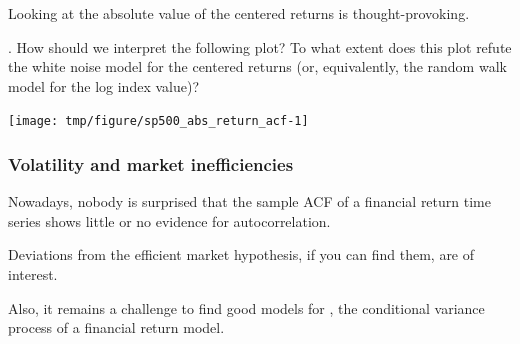 \begin{frame}[fragile]

\vspace{-2mm}

\bi

\item Looking at the absolute value of the centered returns is thought-provoking.

\ei


\myquestion. How should we interpret the following plot? To what extent does this plot refute the white noise model for the centered returns (or, equivalently, the random walk model for the log index value)?


\begin{knitrout}\small
{}\color{fgcolor}\begin{kframe}
\begin{alltt}
\hldef{(}\hlopt{-}\hldef{=}\hldef{)}
\end{alltt}
\end{kframe}
\end{knitrout}

\vspace{-1mm}

\begin{knitrout}\small
{}\color{fgcolor}

{\centering \texttt{[image: tmp/figure/sp500\_abs\_return\_acf-1]} 

}


\end{knitrout}


\end{frame}

\begin{frame}[fragile]

\frametitle{Volatility and market inefficiencies}

\bi

\item Nowadays, nobody is surprised that the sample ACF of a financial return time series shows little or no evidence for autocorrelation.

\item Deviations from the efficient market hypothesis, if you can find them, are of interest.

\item Also, it remains a challenge to find good models for , the conditional variance process of a financial return model.

\ei

\end{frame}

